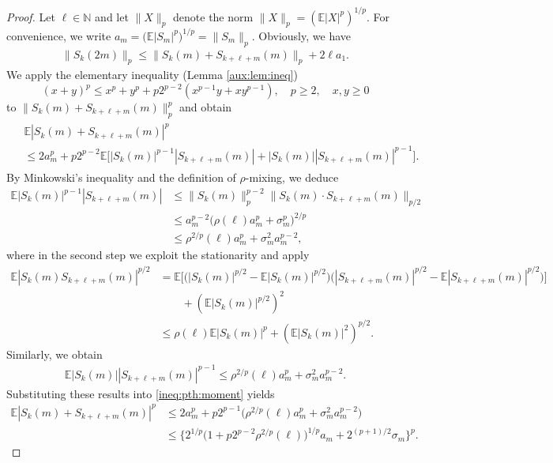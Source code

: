 \documentclass[11pt,a4,leqno]{amsart}
\newcommand{\N}{\mathbb{N}}
\newcommand{\E }{{\mathbb E}}
\newcommand{\1}{{\mathbf 1}}
\begin{document}
\begin{proof}
Let $\ell\in \N$ and let $\|X\|_p$ denote the norm $\|X\|_p=(\E|X|^p)^{1/p}$. 
For convenience, we write $a_m= \big(\E |S_m|^p \big)^{1/p}=\|S_m\|_p$. 
Obviously, we have 
\begin{align}
\label{ineq:pth:norm}
 \|S_k(2m)\|_p \le \|S_k(m)+S_{k+\ell+m}(m)\|_p +2 \ell a_1. 
\end{align}
We apply the elementary inequality (Lemma \ref{aux:lem:ineq})
\[
 (x+y)^p \le x^p + y^p + p 2^{p-2} (x^{p-1}y + x y^{p-1}),\quad p\ge 2,\quad x,y\ge 0
\]
to $\|S_k(m)+S_{k+\ell+m}(m)\|_p^p$ and obtain  
\begin{align}
\label{ineq:pth:moment}
\begin{split}
& \E|S_k(m)+S_{k+\ell+m}(m)|^p \\
& \le 2a_m^p+ p2^{p-2} 
\E\big[
|S_k(m)|^{p-1}|S_{k+\ell+m}(m)|+|S_k(m)||S_{k+\ell+m}(m)|^{p-1}
\big].
\end{split}
\end{align}
By Minkowski's inequality and the definition of $\rho$-mixing, we deduce  
\begin{align*}
 \E|S_k(m)|^{p-1}|S_{k+\ell+m}(m)| 
& \le \|S_k(m)\|_p^{p-2}\|S_k(m)\cdot S_{k+\ell+m}(m)\|_{p/2} \\
& \le a_m^{p-2}\big(\rho(\ell)a_m^p +\sigma_m^p\big)^{2/p} \\
& \le \rho^{2/p}(\ell) a_m^p +\sigma_m^2 a_m^{p-2},  
\end{align*}
where in the second step we exploit the stationarity and apply
\begin{align*}
 \E|S_k(m)S_{k+\ell+m}(m)|^{p/2} 
&= \E\big[\big(|S_k(m)|^{p/2}-\E|S_k(m)|^{p/2}\big)\big(|S_{k+\ell+m}(m)|^{p/2}-\E|S_{k+\ell+m}(m)|^{p/2}\big)\big] \\
&\qquad + (\E|S_k(m)|^{p/2})^{2} \\
& \le \rho(\ell) \E|S_k(m)|^p + (\E|S_k(m)|^2)^{p/2}. 
\end{align*}
Similarly, we obtain  
\begin{align*}
 \E |S_k(m)||S_{k+\ell+m}(m)|^{p-1} \le \rho^{2/p}(\ell) a_m^p + \sigma_m^2 a_m^{p-2}. 
\end{align*}
Substituting these results into \eqref{ineq:pth:moment} yields 
\begin{align*}
 \E|S_k(m)+S_{k+\ell+m}(m)|^p & 
\le 2 a_m^p + p2^{p-1} \big( \rho^{2/p}(\ell) a_m^p +\sigma_m^2 a_m^{p-2} \big) \\
& \le \big\{
2^{1/p} \big(1+ p2^{p-2} \rho^{2/p}(\ell)\big)^{1/p} a_m + 2^{(p+1)/2} \sigma_m 
\big\}^p. 

\end{align*}
\end{proof}
\end{document}
